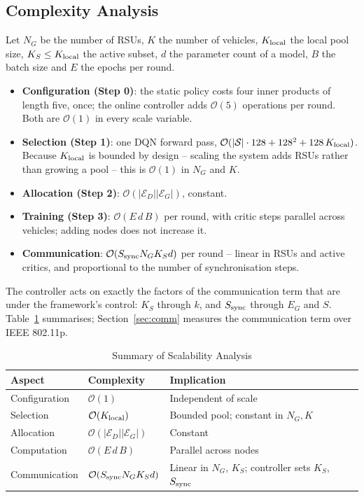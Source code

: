 \documentclass[journal]{IEEEtran}
\begin{document}
\subsection{Complexity Analysis}
\label{sec:complexity}
Let $N_G$ be the number of RSUs, $K$ the number of vehicles, $K_{\rm local}$
the local pool size, $K_S\le K_{\rm local}$ the active subset, $d$ the parameter
count of a model, $B$ the batch size and $E$ the epochs per round.
\begin{itemize}
\item \textbf{Configuration (Step 0)}: the static policy costs four inner
      products of length five, once; the online controller adds
      $\mathcal{O}(5)$ operations per round. Both are $\mathcal{O}(1)$ in every
      scale variable.
\item \textbf{Selection (Step 1)}: one DQN forward pass,
      $\mathcal{O}(|\mathcal{S}|\cdot128+128^2+128\,K_{\rm local})$. Because
      $K_{\rm local}$ is bounded by design -- scaling the system adds RSUs
      rather than growing a pool -- this is $\mathcal{O}(1)$ in $N_G$ and $K$.
\item \textbf{Allocation (Step 2)}: $\mathcal{O}(|\mathcal{E}_D||\mathcal{E}_G|)$,
      constant.
\item \textbf{Training (Step 3)}: $\mathcal{O}(E\,d\,B)$ per round, with critic
      steps parallel across vehicles; adding nodes does not increase it.
\item \textbf{Communication}: $\mathcal{O}(S_{\rm sync}N_GK_Sd)$ per round --
      linear in RSUs and active critics, and proportional to the number of
      synchronisation steps.
\end{itemize}
The controller acts on exactly the factors of the communication term that are
under the framework's control: $K_S$ through $k$, and $S_{\rm sync}$ through
$E_G$ and $S$. Table~\ref{tab:complexity} summarises; Section~\ref{sec:comm}
measures the communication term over IEEE 802.11p.

\begin{table}[!t]
\centering
\caption{Summary of Scalability Analysis}
\label{tab:complexity}
\footnotesize
\begin{tabular}{lll}
\toprule
Aspect & Complexity & Implication \\
\midrule
Configuration & $\mathcal{O}(1)$ & Independent of scale \\
Selection & $\mathcal{O}(K_{\rm local})$ & Bounded pool; constant in $N_G,K$ \\
Allocation & $\mathcal{O}(|\mathcal{E}_D||\mathcal{E}_G|)$ & Constant \\
Computation & $\mathcal{O}(E\,d\,B)$ & Parallel across nodes \\
Communication & $\mathcal{O}(S_{\rm sync}N_GK_Sd)$ & Linear in $N_G$, $K_S$; controller sets $K_S$, $S_{\rm sync}$ \\
\bottomrule
\end{tabular}
\end{table}
\end{document}
